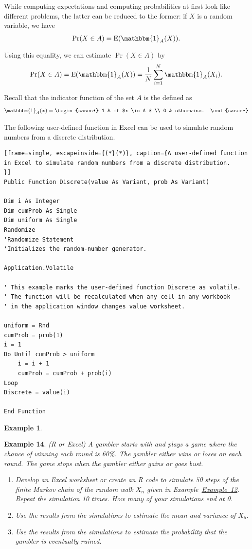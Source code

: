 \documentclass[
]{book}
\theoremstyle{definition}
\theoremstyle{definition}
\newtheorem{example}{Example}[chapter]
\theoremstyle{definition}
\theoremstyle{definition}
\theoremstyle{remark}
\begin{document}
While computing expectations and computing probabilities at first look
like different problems, the latter can be reduced to the former: if \(X\)
is a random variable, we have
\[\Pr(X \in A) = \mathrm{E}(\mathbbm{1}_A(X)).\]

Using this equality, we can estimate \(\Pr(X \in A)\) by
\[\Pr(X \in A) = \mathrm{E}(\mathbbm{1}_A(X)) = \frac{1}{N}\sum_{i=1}^N \mathbbm{1}_A(X_i).\]

Recall that the indicator function of the set \(A\) is the defined as
\[\mathbbm{1}_A(x) =
\begin{cases*}
     1          & if $x \in A $ \\
      0        & otherwise.
\end{cases*}\]

The following user-defined function in Excel can be used to simulate
random numbers from a discrete distribution.

\begin{verbatim}
[frame=single, escapeinside={(*}{*)}, caption={A user-defined function in Excel to simulate random numbers from a discrete distribution.
}]
Public Function Discrete(value As Variant, prob As Variant)

Dim i As Integer
Dim cumProb As Single
Dim uniform As Single
Randomize
'Randomize Statement
'Initializes the random-number generator.

Application.Volatile

' This example marks the user-defined function Discrete as volatile.
' The function will be recalculated when any cell in any workbook
' in the application window changes value worksheet.

uniform = Rnd
cumProb = prob(1)
i = 1
Do Until cumProb > uniform
    i = i + 1
    cumProb = cumProb + prob(i)
Loop
Discrete = value(i)

End Function
\end{verbatim}

\begin{example}
\protect\hypertarget{exm:unlabeled-div-22}{}\label{exm:unlabeled-div-22}

\textbf{Example 14}. \emph{(R or Excel) A gambler starts with and plays a game
where the chance of winning each round is 60\%. The gambler either wins
or loses on each round. The game stops when the gambler either gains or
goes bust.}

\begin{enumerate}
\def\labelenumi{\arabic{enumi}.}
\item
  \emph{Develop an Excel worksheet or create an R code to simulate 50 steps
  of the finite Markov chain of the random walk \(X_n\) given in
  Example~\protect\hyperlink{simpleRW}{Example~12}. Repeat the simulation 10 times. How many of
  your simulations end at 0.}
\item
  \emph{Use the results from the simulations to estimate the mean and
  variance of \(X_{5}\).}
\item
  \emph{Use the results from the simulations to estimate the probability
  that the gambler is eventually ruined.}
\end{enumerate}

\end{example}
\end{document}
